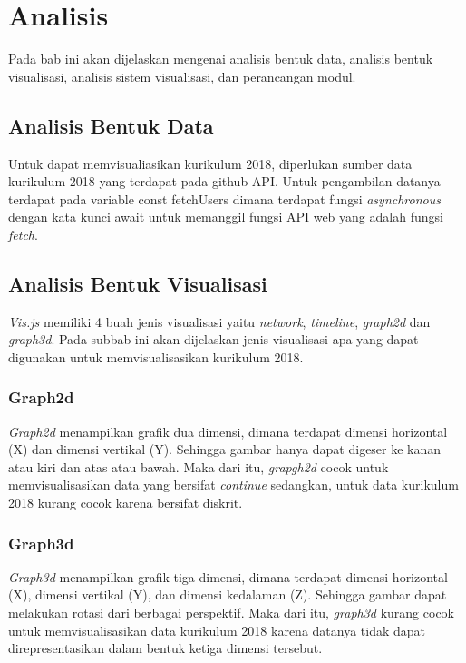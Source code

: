 \chapter{Analisis}
\label{chap:analisis}

Pada bab ini akan dijelaskan mengenai analisis bentuk data, analisis bentuk visualisasi, analisis sistem visualisasi, dan perancangan modul.

\section{Analisis Bentuk Data}
Untuk dapat memvisualiasikan kurikulum 2018, diperlukan sumber data kurikulum 2018 yang terdapat pada github API. Untuk pengambilan datanya terdapat pada variable const fetchUsers dimana terdapat fungsi \textit{asynchronous} dengan kata kunci await untuk memanggil fungsi API web yang adalah fungsi \textit{fetch}.

\section{Analisis Bentuk Visualisasi}

\textit{Vis.js} memiliki 4 buah jenis visualisasi yaitu \textit{network}, \textit{timeline}, \textit{graph2d} dan \textit{graph3d}. Pada subbab ini akan dijelaskan jenis visualisasi apa yang dapat digunakan untuk memvisualisasikan kurikulum 2018.

\subsection{Graph2d}
\textit{Graph2d} menampilkan grafik dua dimensi, dimana terdapat dimensi horizontal (X) dan dimensi vertikal (Y). Sehingga gambar hanya dapat digeser ke kanan atau kiri dan atas atau bawah. Maka dari itu, \textit{grapgh2d} cocok untuk memvisualisasikan data yang bersifat \textit{continue} sedangkan, untuk data kurikulum 2018 kurang cocok karena bersifat diskrit.

\subsection{Graph3d}
\textit{Graph3d} menampilkan grafik tiga dimensi, dimana terdapat dimensi horizontal (X), dimensi vertikal (Y), dan dimensi kedalaman (Z). Sehingga gambar dapat melakukan rotasi dari berbagai perspektif. Maka dari itu, \textit{graph3d} kurang cocok untuk memvisualisasikan data kurikulum 2018 karena datanya tidak dapat direpresentasikan dalam bentuk ketiga dimensi tersebut.

